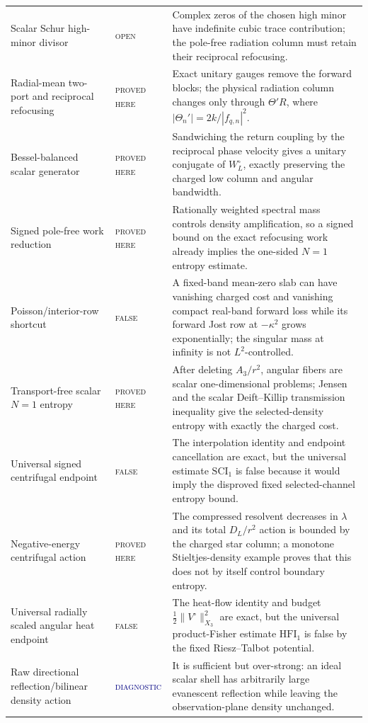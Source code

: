 \documentclass[11pt]{article}
\newcommand{\statusproved}{\textcolor{proved}{\textsc{proved here}}}
\newcommand{\statusopen}{\textcolor{open}{\textsc{open}}}
\newcommand{\statusfailed}{\textcolor{failed}{\textsc{false}}}
\newcommand{\statusdiagnostic}{\textcolor{navy}{\textsc{diagnostic}}}
\theoremstyle{definition}
\theoremstyle{remark}
\begin{document}
\begin{longtable}{>{\raggedright\arraybackslash}p{}>{\raggedright\arraybackslash}p{}>{\raggedright\arraybackslash}p{}}
Scalar Schur high-minor divisor & \statusopen & Complex zeros of the chosen high minor have indefinite cubic trace contribution; the pole-free radiation column must retain their reciprocal refocusing. \\
Radial-mean two-port and reciprocal refocusing & \statusproved & Exact unitary gauges remove the forward blocks; the physical radiation column changes only through $\Theta'R$, where $|\Theta_n'|=2k/|f_{q,n}|^2$. \\
Bessel-balanced scalar generator & \statusproved & Sandwiching the return coupling by the reciprocal phase velocity gives a unitary conjugate of $W_L^\circ$, exactly preserving the charged low column and angular bandwidth. \\
Signed pole-free work reduction & \statusproved & Rationally weighted spectral mass controls density amplification, so a signed bound on the exact refocusing work already implies the one-sided $N=1$ entropy estimate. \\
Poisson/interior-row shortcut & \statusfailed & A fixed-band mean-zero slab can have vanishing charged cost and vanishing compact real-band forward loss while its forward Jost row at $-\kappa^2$ grows exponentially; the singular mass at infinity is not $L^2$-controlled. \\
Transport-free scalar $N=1$ entropy & \statusproved & After deleting $A_3/r^2$, angular fibers are scalar one-dimensional problems; Jensen and the scalar Deift--Killip transmission inequality give the selected-density entropy with exactly the charged cost. \\
Universal signed centrifugal endpoint & \statusfailed & The interpolation identity and endpoint cancellation are exact, but the universal estimate $\mathrm{SCI}_1$ is false because it would imply the disproved fixed selected-channel entropy bound. \\
Negative-energy centrifugal action & \statusproved & The compressed resolvent decreases in $\lambda$ and its total $D_L/r^2$ action is bounded by the charged star column; a monotone Stieltjes-density example proves that this does not by itself control boundary entropy. \\
Universal radially scaled angular heat endpoint & \statusfailed & The heat-flow identity and budget $\frac12\|V^\circ\|_{X_3}^2$ are exact, but the universal product-Fisher estimate $\mathrm{HFI}_1$ is false by the fixed Riesz--Talbot potential. \\
Raw directional reflection/bilinear density action & \statusdiagnostic & It is sufficient but over-strong: an ideal scalar shell has arbitrarily large evanescent reflection while leaving the observation-plane density unchanged. \\

\end{longtable}
\end{document}
